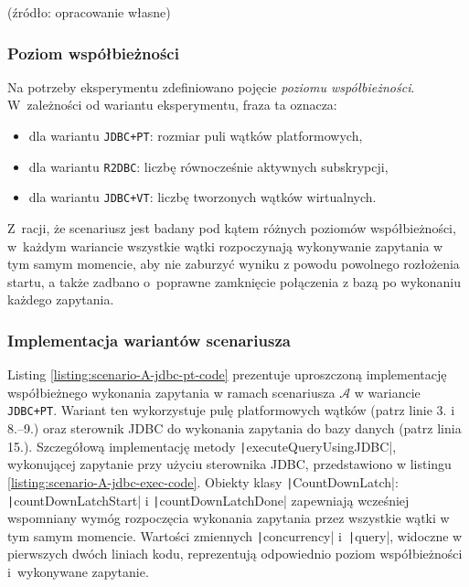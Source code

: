 \vspace{-20pt}
\begin{center}
    \small{(źródło: opracowanie własne)}
\end{center}

\subsubsection{Poziom współbieżności}
Na potrzeby eksperymentu zdefiniowano pojęcie \emph{poziomu współbieżności}. W~zależności od wariantu eksperymentu, fraza ta oznacza:
\begin{itemize}
    \itemsep0em
    \item dla wariantu \texttt{JDBC+PT}: rozmiar puli wątków platformowych,
    \item dla wariantu \texttt{R2DBC}: liczbę równocześnie aktywnych subskrypcji,
    \item dla wariantu \texttt{JDBC+VT}: liczbę tworzonych wątków wirtualnych.
\end{itemize}
Z~racji, że scenariusz jest badany pod kątem różnych poziomów współbieżności, w~każdym wariancie wszystkie wątki rozpoczynają wykonywanie zapytania w tym samym momencie, aby nie zaburzyć wyniku z powodu powolnego rozłożenia startu, a także zadbano o~poprawne zamknięcie połączenia z bazą po wykonaniu każdego zapytania.

\subsubsection{Implementacja wariantów scenariusza}

Listing \ref{listing:scenario-A-jdbc-pt-code} prezentuje uproszczoną implementację współbieżnego wykonania zapytania w ramach scenariusza $\mathcal{A}$ w wariancie \texttt{JDBC+PT}. Wariant ten wykorzystuje pulę platformowych wątków (patrz linie 3. i 8.--9.) oraz sterownik JDBC do wykonania zapytania do bazy danych (patrz linia 15.). Szczegółową implementację metody \texttt|executeQueryUsingJDBC|, wykonującej zapytanie przy użyciu sterownika JDBC, przedstawiono w listingu \ref{listing:scenario-A-jdbc-exec-code}. Obiekty klasy \texttt|CountDownLatch|: \texttt|countDownLatchStart| i \texttt|countDownLatchDone| zapewniają wcześniej wspomniany wymóg rozpoczęcia wykonania zapytania przez wszystkie wątki w tym samym momencie. Wartości zmiennych \texttt|concurrency| i~\texttt|query|, widoczne w pierwszych dwóch liniach kodu, reprezentują odpowiednio poziom współbieżności i~wykonywane zapytanie.


